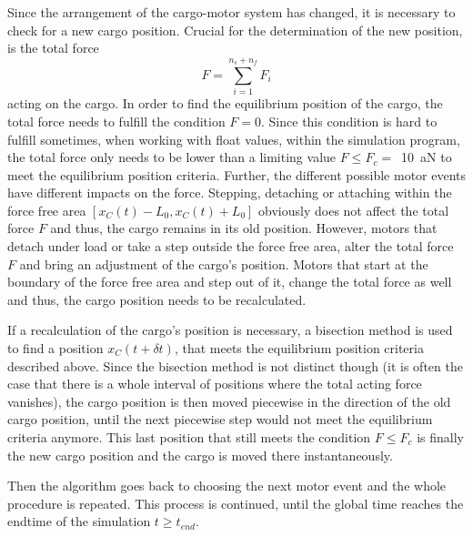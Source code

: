 Since the arrangement of the cargo-motor system has changed, it is necessary to check for a new cargo position. Crucial for the determination of the new position, is the total force
\begin{equation}\label{e.total-acting-force-on-cargo}
 F = \sum_{i = 1}^{n_s + n_f} F_i
\end{equation}
acting on the cargo. In order to find the equilibrium position of the cargo, the total force needs to fulfill the condition \mbox{$F = 0$}. Since this condition is hard to fulfill sometimes, when
working with float values, within the simulation program, the total force only needs to be lower than a limiting value \mbox{$F \leq F_c =$ \SI{10}{\atto\newton}} to meet the equilibrium position
criteria. Further, the different possible motor events have different impacts on the force. Stepping, detaching or attaching within the force free area 
\mbox{$\left[x_C\left(t\right) - L_0, x_C\left(t\right) + L_0\right]$} obviously does not affect the total force $F$ and thus, the cargo remains in its old position. However, motors that
detach under load or take a step outside the force free area, alter the total force $F$ and bring an adjustment of the cargo's position. Motors that start at the boundary of the force free area
and step out of it, change the total force as well and thus, the cargo position needs to be recalculated.

If a recalculation of the cargo's position is necessary, a bisection method is used to find a position \mbox{$x_C\left(t + \delta t\right)$}, that meets the equilibrium position criteria described
above. Since the bisection method is not distinct though (it is often the case that there is a whole interval of positions where the total acting force vanishes), the cargo position is then moved
piecewise in the direction of the old cargo position, until the next piecewise step would not meet the equilibrium criteria anymore. This last position that still meets the condition
\mbox{$F \leq F_c$} is finally the new cargo position and the cargo is moved there instantaneously.

Then the algorithm goes back to choosing the next motor event and the whole procedure is repeated. This process is continued, until the global time reaches the endtime of the simulation
\mbox{$t \geq t_{end}$}.

